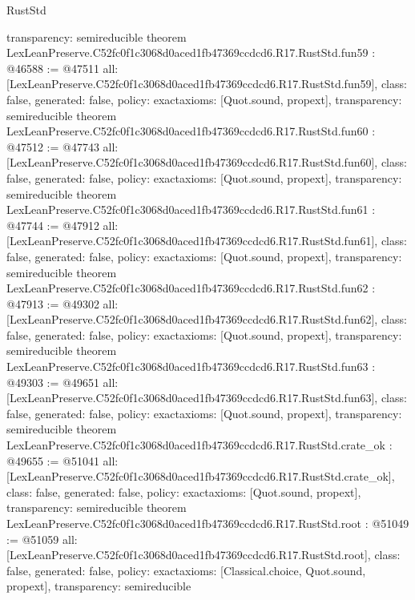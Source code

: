 \begin{lexlean}{RustStd}
\begin{coremodule}
{  transparency: semireducible
}
theorem LexLeanPreserve.C52fc0f1c3068d0aced1fb47369ccdcd6.R17.RustStd.fun59 : @46588 := @47511 {
  all: [LexLeanPreserve.C52fc0f1c3068d0aced1fb47369ccdcd6.R17.RustStd.fun59],
  class: false,
  generated: false,
  policy: exact{axioms: [Quot.sound, propext]},
  transparency: semireducible
}
theorem LexLeanPreserve.C52fc0f1c3068d0aced1fb47369ccdcd6.R17.RustStd.fun60 : @47512 := @47743 {
  all: [LexLeanPreserve.C52fc0f1c3068d0aced1fb47369ccdcd6.R17.RustStd.fun60],
  class: false,
  generated: false,
  policy: exact{axioms: [Quot.sound, propext]},
  transparency: semireducible
}
theorem LexLeanPreserve.C52fc0f1c3068d0aced1fb47369ccdcd6.R17.RustStd.fun61 : @47744 := @47912 {
  all: [LexLeanPreserve.C52fc0f1c3068d0aced1fb47369ccdcd6.R17.RustStd.fun61],
  class: false,
  generated: false,
  policy: exact{axioms: [Quot.sound, propext]},
  transparency: semireducible
}
theorem LexLeanPreserve.C52fc0f1c3068d0aced1fb47369ccdcd6.R17.RustStd.fun62 : @47913 := @49302 {
  all: [LexLeanPreserve.C52fc0f1c3068d0aced1fb47369ccdcd6.R17.RustStd.fun62],
  class: false,
  generated: false,
  policy: exact{axioms: [Quot.sound, propext]},
  transparency: semireducible
}
theorem LexLeanPreserve.C52fc0f1c3068d0aced1fb47369ccdcd6.R17.RustStd.fun63 : @49303 := @49651 {
  all: [LexLeanPreserve.C52fc0f1c3068d0aced1fb47369ccdcd6.R17.RustStd.fun63],
  class: false,
  generated: false,
  policy: exact{axioms: [Quot.sound, propext]},
  transparency: semireducible
}
theorem LexLeanPreserve.C52fc0f1c3068d0aced1fb47369ccdcd6.R17.RustStd.crate_ok : @49655 := @51041 {
  all: [LexLeanPreserve.C52fc0f1c3068d0aced1fb47369ccdcd6.R17.RustStd.crate_ok],
  class: false,
  generated: false,
  policy: exact{axioms: [Quot.sound, propext]},
  transparency: semireducible
}
theorem LexLeanPreserve.C52fc0f1c3068d0aced1fb47369ccdcd6.R17.RustStd.root : @51049 := @51059 {
  all: [LexLeanPreserve.C52fc0f1c3068d0aced1fb47369ccdcd6.R17.RustStd.root],
  class: false,
  generated: false,
  policy: exact{axioms: [Classical.choice, Quot.sound, propext]},
  transparency: semireducible
}


\end{coremodule}
\end{lexlean}
